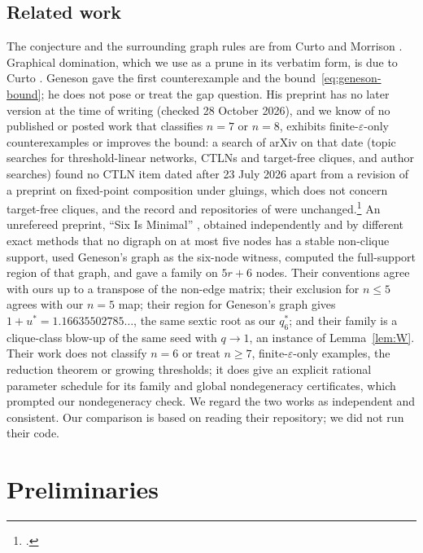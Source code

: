 \documentclass[11pt]{article}
\theoremstyle{definition}
\newcommand{\eps}{\varepsilon}
\begin{document}
\subsection{Related work}
The conjecture and the surrounding graph rules are from Curto and Morrison \cite{CurtoMorrison2023}.
Graphical domination, which we use as a prune in its verbatim form, is due to Curto \cite{Curto2025}.
Geneson \cite{Geneson2026} gave the first counterexample and the bound~\eqref{eq:geneson-bound}; he does
not pose or treat the gap question. His preprint has no later version at the time of writing (checked 28 October 2026),
and we know of no published or posted work that classifies $n=7$ or $n=8$, exhibits finite-$\eps$-only counterexamples or
improves the bound: a search of arXiv on that date (topic searches for threshold-linear networks, CTLNs and target-free
cliques, and author searches) found no CTLN item dated after 23 July 2026 apart from a revision of a preprint on fixed-point
composition under gluings, which does not concern target-free cliques, and the record and repositories of
\cite{SixIsMinimal2026} were unchanged.\footnote{.}
An unrefereed preprint, ``Six Is Minimal'' \cite{SixIsMinimal2026}, obtained independently and by
different exact methods that no digraph on at most five nodes has a stable non-clique support, used
Geneson's graph as the six-node witness, computed the full-support region of that graph, and gave a
family on $5r+6$ nodes. Their conventions agree with ours up to a transpose of the non-edge matrix; their
exclusion for $n\le5$ agrees with our $n=5$ map; their region for Geneson's graph gives
$1+u^*=1.16635502785\ldots$, the same sextic root as our $q_6^*$; and their family is a clique-class
blow-up of the same seed with $q\to1$, an instance of Lemma~\ref{lem:W}. Their work does not classify
$n=6$ or treat $n\ge7$, finite-$\eps$-only examples, the reduction theorem or growing thresholds; it does
give an explicit rational parameter schedule for its family and global nondegeneracy certificates, which
prompted our nondegeneracy check. We regard the two works as independent and consistent.
Our comparison is based on reading their repository; we did not run their code.

\section{Preliminaries}\label{sec:prelim}
\end{document}
